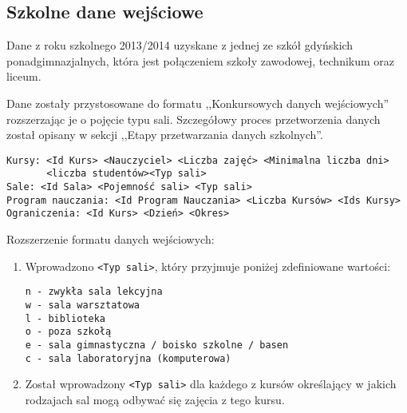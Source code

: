 \subsection{Szkolne dane wejściowe}
\par Dane z roku szkolnego 2013/2014 uzyskane z jednej ze szkół gdyńskich ponadgimnazjalnych, która jest połączeniem szkoły zawodowej, technikum oraz liceum.
\par Dane zostały przystosowane do formatu ,,Konkursowych danych wejściowych'' rozszerzając je o pojęcie typu sali. Szczegółowy proces przetworzenia danych został opisany w sekcji ,,Etapy przetwarzania danych szkolnych''.
\begin{verbatim}
Kursy: <Id Kurs> <Nauczyciel> <Liczba zajęć> <Minimalna liczba dni> 
	   <liczba studentów><Typ sali>
Sale: <Id Sala> <Pojemność sali> <Typ sali>
Program nauczania: <Id Program Nauczania> <Liczba Kursów> <Ids Kursy>
Ograniczenia: <Id Kurs> <Dzień> <Okres>
\end{verbatim}
Rozszerzenie formatu danych wejściowych:
\begin{enumerate}
\item Wprowadzono \verb#<Typ sali>#, który przyjmuje poniżej zdefiniowane wartości:
\begin{verbatim}
n - zwykła sala lekcyjna
w - sala warsztatowa
l - biblioteka
o - poza szkołą
e - sala gimnastyczna / boisko szkolne / basen 
c - sala laboratoryjna (komputerowa)
\end{verbatim}
\item Został wprowadzony \verb#<Typ sali># dla każdego z kursów określający w jakich rodzajach sal mogą odbywać się zajęcia z tego kursu.
\end{enumerate}